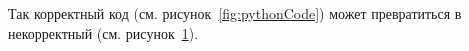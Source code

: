 Так корректный код (см. рисунок~\ref{fig:pythonCode}) может превратиться в некорректный (см. рисунок~\ref{fig:pythonCodeBad}).
\begin{figure}[h!]
	\begin{minipage}[b]{0.45\linewidth}
		\inputminted{python}{codes/pythonCode.py}
		\caption{}
		\label{fig:pythonCode}
	\end{minipage}
	\hspace{0.5cm}
	\begin{minipage}[b]{0.45\linewidth}
		\inputminted{python}{codes/pythonCodeBad.py}
		\caption{}
		\label{fig:pythonCodeBad}
	\end{minipage}
\end{figure}